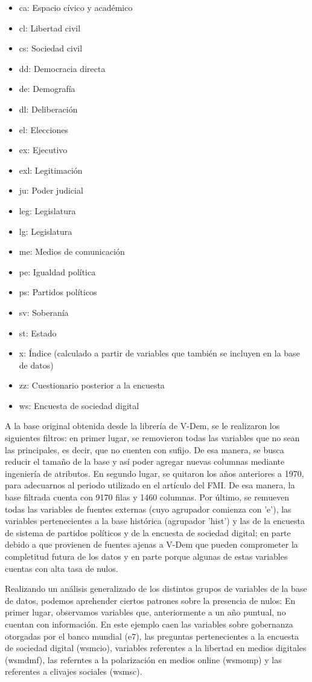\documentclass{article}
\begin{document}
\begin{itemize}
 \item ca: Espacio cívico y académico
 \item cl: Libertad civil
 \item cs: Sociedad civil
 \item dd: Democracia directa
 \item de: Demografía
 \item dl: Deliberación
 \item el: Elecciones
 \item ex: Ejecutivo
 \item exl: Legitimación
 \item ju: Poder judicial
 \item leg: Legislatura
 \item lg: Legislatura
 \item me: Medios de comunicación
 \item pe: Igualdad política
 \item ps: Partidos políticos
 \item sv: Soberanía
 \item st: Estado
 \item x: Índice (calculado a partir de variables que también se 
 incluyen en la base de datos)
 \item zz: Cuestionario posterior a la encuesta
 \item ws: Encuesta de sociedad digital
\end{itemize}

A la base original obtenida desde la librería de V-Dem, se le realizaron los
siguientes filtros: en primer lugar, se removieron todas las variables que
no sean las principales, es decir, que no cuenten con sufijo. De esa manera,
se busca reducir el tamaño de la base y así poder agregar nuevas columnas
mediante ingeniería de atributos. En segundo lugar, se quitaron los años 
anteriores a 1970, para adecuarnos al periodo utilizado en el artículo del FMI.
De esa manera, la base filtrada cuenta con 9170 filas y 1460 columnas. Por último,
se remueven todas las variables de fuentes externas (cuyo agrupador comienza con
'e'), las variables pertenecientes a la base histórica (agrupador 'hist') y las
de la encuesta de sistema de partidos políticos y de la encuesta de sociedad digital; 
en parte debido a que provienen
de fuentes ajenas a V-Dem que pueden comprometer la completitud futura de los datos
y en parte porque algunas de estas variables cuentas con alta tasa de nulos.

Realizando un análisis generalizado de los distintos grupos de variables de la base de
datos, podemos aprehender ciertos patrones sobre la presencia de nulos: 
En primer lugar, observamos variables que,
anteriormente a un año puntual, no cuentan con información. En este ejemplo caen
las variables sobre gobernanza otorgadas por el banco mundial (e7), las preguntas
pertenecientes a la encuesta de sociedad digital (wsmcio), variables referentes a
la libertad en medios digitales (wsmdmf), las referntes a la polarización en medios
online (wsmomp) y las referentes a clivajes sociales (wsmsc).
\end{document}
